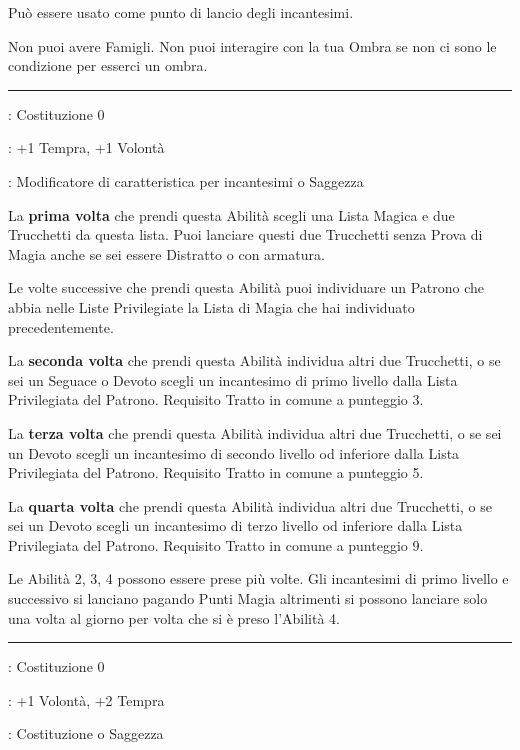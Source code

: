 \begin{multicols}{2}
Può essere usato come punto di lancio degli incantesimi.

Non puoi avere Famigli. Non puoi interagire con la tua Ombra se non ci sono le condizione per esserci un ombra.

\smallskip\noindent\rule{\linewidth}{2pt} \hypertarget{Figlio Unico}{}\medskip{}
\noindent
\begin{description}[noitemsep, topsep=0pt, parsep=0pt, partopsep=0pt, leftmargin=0cm, labelwidth=2.5cm]
    \item[\textbf{Requisito}]: Costituzione 0
    \item[\textbf{Tiri Salvezza}]: +1 Tempra, +1 Volontà
    \item[\textbf{Caratteristica}]: Modificatore di caratteristica per incantesimi o Saggezza
\end{description}

La \textbf{prima volta} che prendi questa Abilità scegli una Lista Magica e due Trucchetti da questa lista. Puoi lanciare questi due Trucchetti senza Prova di Magia anche se sei essere Distratto o con armatura.

Le volte successive che prendi questa Abilità puoi individuare un Patrono che abbia nelle Liste Privilegiate la Lista di Magia che hai individuato precedentemente.

La \textbf{seconda volta} che prendi questa Abilità individua altri due Trucchetti, o se sei un Seguace o Devoto scegli un incantesimo di primo livello dalla Lista Privilegiata del Patrono. Requisito Tratto in comune a punteggio 3.

La \textbf{terza volta} che prendi questa Abilità individua altri due Trucchetti, o se sei un Devoto scegli un incantesimo di secondo livello od inferiore dalla Lista Privilegiata del Patrono. Requisito Tratto in comune a punteggio 5.

La \textbf{quarta volta} che prendi questa Abilità individua altri due Trucchetti, o se sei un Devoto scegli un incantesimo di terzo livello od inferiore dalla Lista Privilegiata del Patrono. Requisito Tratto in comune a punteggio 9.

Le Abilità 2, 3, 4 possono essere prese più volte. Gli incantesimi di primo livello e successivo si lanciano pagando Punti Magia altrimenti si possono lanciare solo una volta al giorno per volta che si è preso l'Abilità 4.

\smallskip\noindent\rule{\linewidth}{2pt} \hypertarget{Finta Morte}{}\medskip{}
\noindent
\begin{description}[noitemsep, topsep=0pt, parsep=0pt, partopsep=0pt, leftmargin=0cm, labelwidth=2.5cm]
    \item[\textbf{Requisito}]: Costituzione 0
    \item[\textbf{Tiri Salvezza}]: +1 Volontà, +2 Tempra
    \item[\textbf{Caratteristica}]: Costituzione o Saggezza
\end{description}


\end{multicols}
